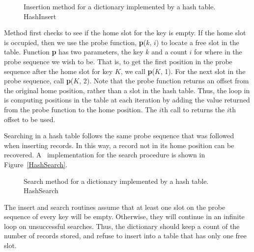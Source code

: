 \begin{figure}

{Insertion method for a dictionary implemented by a hash table.}
{HashInsert}

\end{figure}

Method  first checks to see if the home slot for the
key is empty.
If the home slot is occupied, then we use the
probe function,
\textbf{p}(\(k\), \(i\)) to locate a free slot in the table.
Function \textbf{p} has two parameters,
the key \(k\) and a count \(i\) for where in the probe sequence we
wish to be.
That is, to get the first position in the probe sequence after the
home slot for key \(K\), we call \textbf{p}(\(K\), 1).
For the next slot in the probe sequence, call  \textbf{p}(\(K\), 2).
Note that the probe function returns an offset from the original home
position, rather than a slot in the hash table.
Thus, the  loop in  is computing positions
in the table at each iteration by adding the value returned from the
probe function to the home position.
The \(i\)th call to  returns the \(i\)th offset to be used.

Searching in a hash table follows the same probe sequence that was
followed when inserting records.
In this way, a record not in its home position can be recovered.
A \Lang\ implementation for the search procedure is shown in 
Figure~\ref{HashSearch}.

\begin{figure}

{Search method for a dictionary implemented by a hash table.}
{HashSearch}
\end{figure}

The insert and search routines assume that at least
one slot on the probe sequence of every key will be empty.
Otherwise, they will continue in an infinite loop on unsuccessful
searches.
Thus, the dictionary should keep a count of the number of records
stored, and refuse to insert into a table that has only one free slot.

